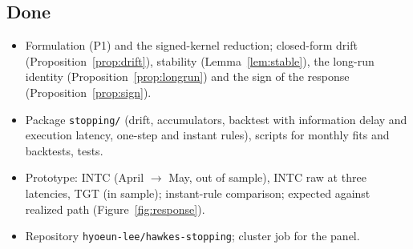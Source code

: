 \documentclass[11pt]{article}
\theoremstyle{definition}
\theoremstyle{remark}
\newcommand{\file}[1]{\texttt{#1}}
\newcommand{\done}{\textcolor{green!45!black}{$\checkmark$}}
\begin{document}
\subsection{Done}
\begin{itemize}[label=\done]
\item Formulation (P1) and the signed-kernel reduction; closed-form drift (Proposition~\ref{prop:drift}), stability (Lemma~\ref{lem:stable}), the long-run identity (Proposition~\ref{prop:longrun}) and the sign of the response (Proposition~\ref{prop:sign}).
\item Package \file{stopping/} (drift, accumulators, backtest with information delay and execution latency, one-step and instant rules), scripts for monthly fits and backtests, tests.
\item Prototype: INTC (April $\to$ May, out of sample), INTC raw at three latencies, TGT (in sample); instant-rule comparison; expected against realized path (Figure~\ref{fig:response}).
\item Repository \file{hyoeun-lee/hawkes-stopping}; cluster job for the panel.
\end{itemize}
\end{document}
